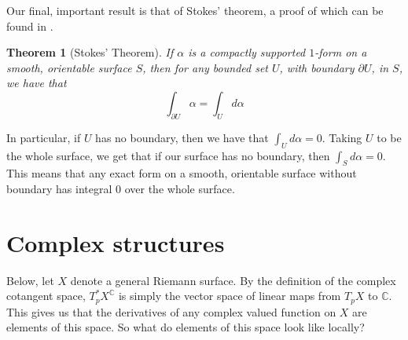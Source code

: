 \documentclass[11pt]{report}
\newtheorem{thm}{Theorem}[section]
\theoremstyle{definition}
\begin{document}
Our final, important result is that of Stokes' theorem, a proof of which can be found in \cite[Theorem 5-5]{spivak}.
\begin{thm}[Stokes' Theorem]
  If $\alpha$ is a compactly supported $1$-form on a smooth, orientable surface $S$, then for any bounded set $U$, with boundary $\partial U$, in $S$, we have that 
  \[\int_{\partial U} \alpha = \int_U d\alpha \]
 
\end{thm} 
In particular, if $U$ has no boundary, then we have that $\int_U d\alpha = 0$. Taking $U$ to be the whole surface, we get that if our surface has no boundary, then $\int_S d\alpha = 0$. This means that any exact form on a smooth, orientable surface without boundary has integral $0$ over the whole surface.

\section{Complex structures}
Below, let $X$ denote a general Riemann surface. By the definition of the complex cotangent space, $T^*_pX^{\mathbb{C}}$ is simply the vector space of linear maps from $T_pX$ to $\mathbb{C}$. This gives us that the derivatives of any complex valued function on $X$ are elements of this space. So what do elements of this space look like locally? 
\end{document}
